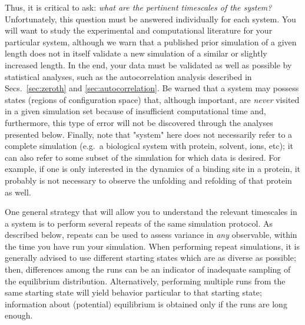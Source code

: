 Thus, it is critical to ask: \emph{what are the pertinent timescales of the system?} 
Unfortunately, this question must be answered individually for each system.  You will want to study the experimental and computational literature for your particular system, although we warn that a published prior simulation of a given length does not in itself validate a new simulation of a similar or slightly increased length.  In the end, your data must be validated as well as possible by statistical analyses, such as the autocorrelation analysis described in Secs.~\ref{sec:zeroth} and \ref{sec:autocorrelation}.  Be warned that a system may possess states (regions of configuration space) that, although important, are \emph{never} visited in a given simulation set because of insufficient computational time \cite{Grossfield2009} and, furthermore, this type of error will not be discovered through the analyses presented below.
Finally, note that "system" here does not necessarily refer to a complete simulation (e.g.~a biological system with protein, solvent, ions, etc); it can also refer to some subset of the simulation for which data is desired.  For example, if one is only interested in the dynamics of a binding site in a protein, it probably is not necessary to observe the unfolding and refolding of that protein as well.

One general strategy that will allow you to understand the relevant timescales in a system is to perform several repeats of the same simulation protocol.  As described below, repeats can be used to assess variance in \emph{any} observable, within the time you have run your simulation.
When performing repeat simulations, it is generally advised to use different starting states which are as diverse as possible; then, differences among the runs can be an indicator of inadequate sampling of the equilibrium distribution.
Alternatively, performing multiple runs from the same starting state will yield behavior particular to that starting state; information about (potential) equilibrium is obtained only if the runs are long enough.



